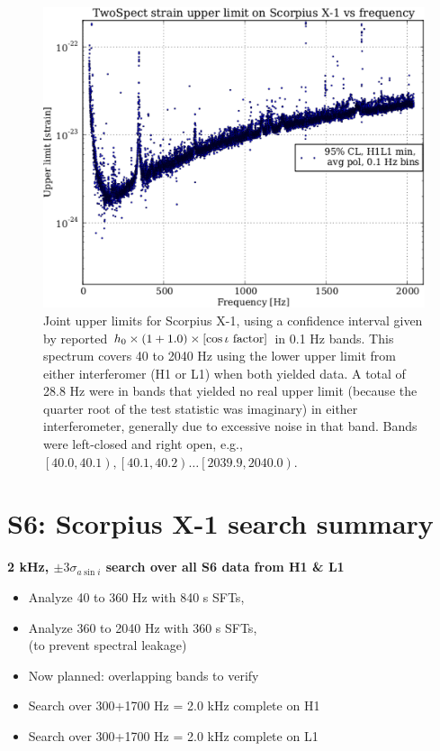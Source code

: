 \begin{figure}
\begin{center}
\includegraphics[width=0.8\paperwidth,height=0.4\paperheight]{plots/ScoX1ULs.eps}
\caption{
Joint upper limits for Scorpius X-1, using a confidence interval given by reported $h_0 \times \left( 1 + 1.0 \right) \times \left[\cos\iota \textup{ factor}\right]$ in 0.1 Hz bands. 
This spectrum covers 40 to 2040 Hz using the lower upper limit from either interferomer (H1 or L1) when both yielded data. 
A total of 28.8 Hz were in bands that yielded no real upper limit (because the quarter root of the test statistic was imaginary) in either interferometer, generally due to excessive noise in that band.
Bands were left-closed and right open, e.g., $\left[ 40.0,40.1\right), \left[ 40.1,40.2\right)\ldots \left[2039.9,2040.0\right)$.
}
\end{center}
\end{figure}

\section{S6: Scorpius X-1 search summary}

\textbf{2 kHz, $\pm 3 \sigma_{a \sin i}$ search over all S6 data from H1 \& L1}
\begin{itemize}
\item Analyze 40 to 360 Hz with 840 s SFTs,
\item Analyze 360 to 2040 Hz with 360 s SFTs,\\
(to prevent spectral leakage)
\item Now planned: overlapping bands to verify
\item Search over 300+1700 Hz = 2.0 kHz complete on H1
\item Search over 300+1700 Hz = 2.0 kHz complete on L1
\end{itemize}


